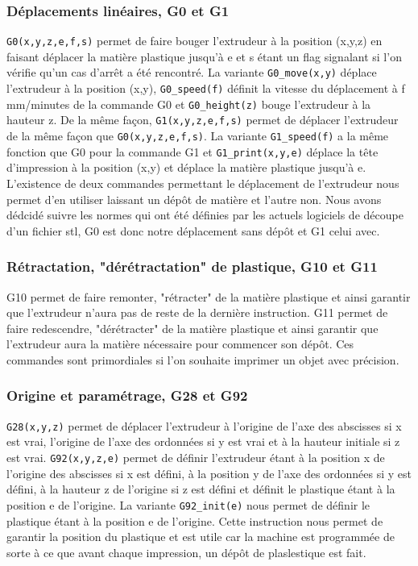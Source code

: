 \documentclass[11pt, titlepage]{article}
\begin{document}
    \subsubsection{Déplacements linéaires, G0 et G1}
	\verb&G0(x,y,z,e,f,s)& permet de faire bouger l'extrudeur à la position (x,y,z) en faisant déplacer la matière plastique jusqu'à e et s étant un flag signalant si l'on vérifie qu'un cas d'arrêt a été rencontré. La variante \verb&G0_move(x,y)& déplace l'extrudeur à la position (x,y), \verb&G0_speed(f)& définit la vitesse du déplacement à f mm/minutes de la commande G0 et \verb&G0_height(z)& bouge l'extrudeur à la hauteur z.
De la même façon, \verb&G1(x,y,z,e,f,s)& permet de déplacer l'extrudeur de la même façon que \verb&G0(x,y,z,e,f,s)&. La variante \verb&G1_speed(f)& a la même fonction que G0 pour la commande G1 et \verb&G1_print(x,y,e)& déplace la tête d'impression à la position (x,y) et déplace la matière plastique jusqu'à e.
L'existence de deux commandes permettant le déplacement de l'extrudeur nous permet d'en utiliser laissant un dépôt de matière et l'autre non. Nous avons dédcidé suivre les normes qui ont été définies par les actuels logiciels de découpe d'un fichier stl, G0 est donc notre déplacement sans dépôt et G1 celui avec.
	\subsubsection{Rétractation, "dérétractation" de plastique, G10 et G11}
	G10 permet de faire remonter, "rétracter" de la matière plastique et ainsi garantir que l'extrudeur n'aura pas de reste de la dernière instruction.
G11 permet de  faire redescendre, "dérétracter" de la matière plastique et ainsi garantir que l'extrudeur aura la matière nécessaire pour commencer son dépôt.
Ces commandes sont primordiales si l'on souhaite imprimer un objet avec précision.
	\subsubsection{Origine et paramétrage, G28 et G92}
	\verb&G28(x,y,z)& permet de déplacer l'extrudeur à l'origine de l'axe des abscisses si x est vrai, l'origine de l'axe des ordonnées si y est vrai et à la hauteur initiale si z est vrai.
\verb&G92(x,y,z,e)& permet de définir l'extrudeur étant à la position x de l'origine des abscisses si x est défini, à la position y de l'axe des ordonnées si y est défini, à la hauteur z de l'origine si z est défini et définit le plastique étant à la position e de l'origine. La variante \verb&G92_init(e)& nous permet de définir le plastique étant à la position e de l'origine. Cette instruction nous permet de garantir la position du plastique et est utile car la machine est programmée de sorte à ce que avant chaque impression, un dépôt de plaslestique est fait.
\end{document}
